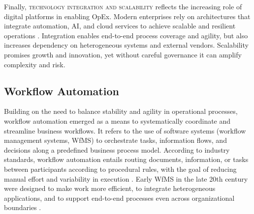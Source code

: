 Finally, \textsc{technology integration and scalability} reflects the increasing role of digital platforms in enabling OpEx. Modern enterprises rely on architectures that integrate automation, AI, and cloud services to achieve scalable and resilient operations \parencite{owoadeSystematic2024}. Integration enables end-to-end process coverage and agility, but also increases dependency on heterogeneous systems and external vendors. Scalability promises growth and innovation, yet without careful governance it can amplify complexity and risk.

\subsection{Workflow Automation}\label{subsec:workflow-auto}
Building on the need to balance stability and agility in operational processes, workflow automation emerged as a means to systematically coordinate and streamline business workflows. It refers to the use of software systems (workflow management systems, WfMS) to orchestrate tasks, information flows, and decisions along a predefined business process model. According to industry standards, workflow automation entails routing documents, information, or tasks between participants according to procedural rules, with the goal of reducing manual effort and variability in execution \parencite[cf.][p. 2]{basuResearch2002}. Early WfMS in the late 20th century were designed to make work more efficient, to integrate heterogeneous applications, and to support end-to-end processes even across organizational boundaries \parencite[cf.][p. 281]{stohrWorkflow2001}.

